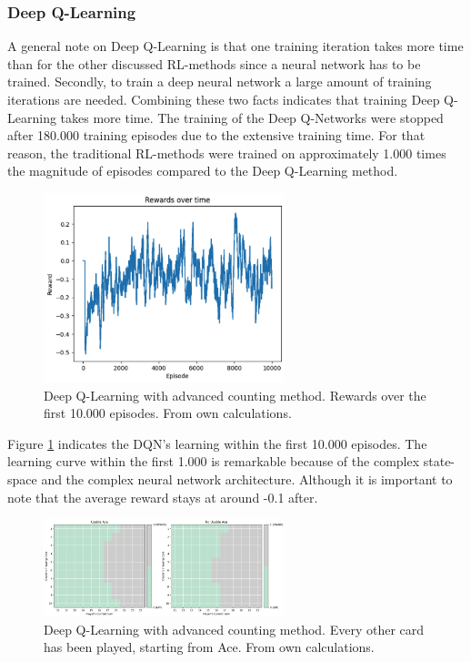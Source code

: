 \documentclass[conference]{IEEEtran}
\begin{document}
\subsubsection{Deep Q-Learning}
A general note on Deep Q-Learning is that one training iteration takes more time than for the other discussed RL-methods since a neural network has to be trained. 
Secondly, to train a deep neural network a large amount of training iterations are needed. 
Combining these two facts indicates that training Deep Q-Learning takes more time.
The training of the Deep Q-Networks were stopped after 180.000 training episodes due to the extensive training time. 
For that reason, the traditional RL-methods were trained on approximately 1.000 times the magnitude of episodes compared to the Deep Q-Learning method.

\begin{figure}
	\centering
	\includegraphics[width=70mm]{figures/DQN/rewards_over_time_10000.png}
	\caption{Deep Q-Learning with advanced counting method. Rewards over the first 10.000 episodes. From own calculations.}
	\label{fig:dqn-rewards-over-time}
\end{figure}

Figure \ref{fig:dqn-rewards-over-time} indicates the DQN's learning within the first 10.000 episodes. 
The learning curve within the first 1.000 is remarkable because of the complex state-space and the complex neural network architecture. 
Although it is important to note that the average reward stays at around -0.1 after.

\begin{figure}
	\centering
	\includegraphics[width=70mm]{figures/DQN/advanced/policy-1010101010.png}
	\caption{Deep Q-Learning with advanced counting method. Every other card has been played, starting from Ace. From own calculations.}
	\label{fig:dqn-advanced-every-other}
\end{figure}
\end{document}
